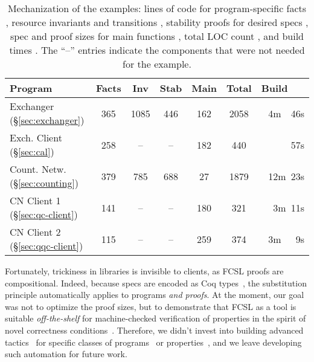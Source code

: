 {
\begin{table}
{%
\sffamily\small %
\centering
\begin{tabular}{|@{\ }l@{\ }||@{\ }c@{\ }|@{\ }c@{\ }|@{\ }c@{\ }|@{\ }c@{\ }|@{\ }c@{\ }||@{\ }r@{\ }|}
  \hline
  \textbf{Program} &  
                     {Facts} & {Inv} &
                                       {Stab} & {Main} & \textbf{Total}
  & \textbf{Build~~~}    
  \\ \hline \hline 
  Exchanger \hfill (\S \ref{sec:exchanger}) & 365 & 1085 & 446 & 162 & 2058 & 4m~~46s
  \\
  Exch. Client \hfill (\S \ref{sec:cal}) & 258 & -- &--& 182 & 440 & 57s
  \\
  Count. Netw. \hfill (\S \ref{sec:counting}) & 379 & 785 & 688 & 27 & 1879 & 12m~23s
  \\
  CN Client 1 \hfill (\S \ref{sec:qc-client}) & 141 &--&--& 180  & 321 & 3m~11s
  \\
  CN Client 2 \hfill (\S \ref{sec:qqc-client})& 115 &--&--& 259 & 374 & 3m~~~9s 
  \\[2pt] \hline
\end{tabular}
}
\caption{
  Mechanization of the examples: lines of code for program-specific facts ,
  resource invariants and transitions , 
  stability proofs for desired specs , spec and proof sizes for main
  functions , total LOC count , and build
  times . The ``--'' entries indicate the
  components that were not needed for the example.
} 
\label{tab:locs}
\end{table}}

Fortunately, trickiness in libraries is invisible to clients, as FCSL
proofs are compositional. Indeed, because specs are encoded as Coq
types~\cite{Sergey-al:PLDI15}, the substitution principle
automatically applies to programs \emph{and proofs}.
%
%
At the moment, our goal was not to optimize the proof sizes, but to
demonstrate that FCSL as a tool is suitable \emph{off-the-shelf} for
machine-checked verification of properties in the spirit of novel
correctness
conditions~\cite{Hemed-al:DISC15,Aspnes-al:JACM94,Jagadeesan-Riely:ICALP14}.
Therefore, we didn't invest into building advanced
tactics~\cite{McCreight:TPHOL09} for specific classes of
programs~\cite{Zee-al:PLDI08} or
properties~\cite{Dragoi-al:CAV13,Vafeiadis:CAV10,Bouajjani-al:POPL15,Burckhardt-al:PLDI10},
and we leave developing such automation for future work.



